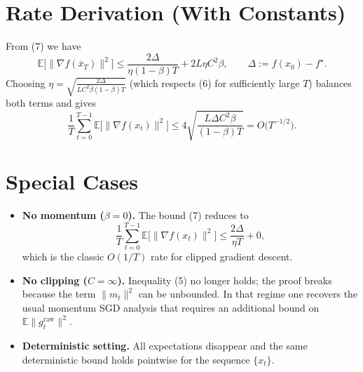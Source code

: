 \documentclass{article}
\begin{document}
\section*{Rate Derivation (With Constants)}
From (7) we have
\[
\mathbb{E}\!\bigl[\|\nabla f(\bar x_T)\|^2\bigr]
\le
\frac{2\Delta}{\eta(1-\beta)T}
+2L\eta C^2\beta,
\qquad
\Delta:=f(x_0)-f^\star .
\]
Choosing $\eta = \sqrt{\frac{2\Delta}{L C^2\beta (1-\beta) T}}$
(which respects (6) for sufficiently large $T$) balances both terms and gives
\[
\frac{1}{T}\sum_{t=0}^{T-1}\mathbb{E}\!\bigl[\|\nabla f(x_t)\|^2\bigr]
\le 4\sqrt{\frac{L\Delta C^2\beta}{(1-\beta)T}}
=O\!\bigl(T^{-1/2}\bigr).
\]

\section*{Special Cases}
\begin{itemize}
\item \textbf{No momentum ($\beta=0$).}
The bound (7) reduces to
\[
\frac{1}{T}\sum_{t=0}^{T-1}\mathbb{E}\!\bigl[\|\nabla f(x_t)\|^2\bigr]
\le \frac{2\Delta}{\eta T}+0,
\]
which is the classic $O(1/T)$ rate for clipped gradient descent.
\item \textbf{No clipping ($C=\infty$).}
Inequality (5) no longer holds; the proof breaks because the term
$\|m_t\|^2$ can be unbounded. In that regime one recovers the usual
momentum SGD analysis that requires an additional bound on
$\mathbb{E}\|g^{\text{raw}}_t\|^2$.
\item \textbf{Deterministic setting.}
All expectations disappear and the same deterministic bound holds
pointwise for the sequence $\{x_t\}$.
\end{itemize}
\end{document}
